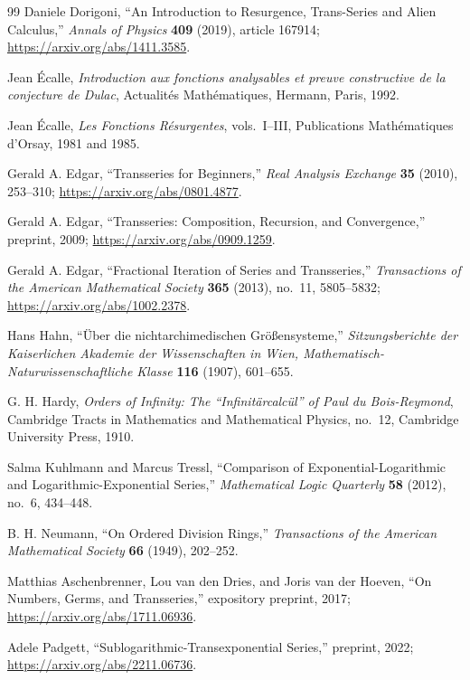 \documentclass[11pt,oneside]{book}
\theoremstyle{definition}
\theoremstyle{remark}
\begin{document}
{\begin{thebibliography}{99}
Daniele Dorigoni,
``An Introduction to Resurgence, Trans-Series and Alien Calculus,''
\emph{Annals of Physics} \textbf{409} (2019), article 167914;
\url{https://arxiv.org/abs/1411.3585}.

Jean \'Ecalle,
\emph{Introduction aux fonctions analysables et preuve constructive de la
conjecture de Dulac}, Actualit\'es Math\'ematiques, Hermann, Paris, 1992.

Jean \'Ecalle,
\emph{Les Fonctions R\'esurgentes}, vols.~I--III,
Publications Math\'ematiques d'Orsay, 1981 and 1985.

Gerald A. Edgar,
``Transseries for Beginners,''
\emph{Real Analysis Exchange} \textbf{35} (2010), 253--310;
\url{https://arxiv.org/abs/0801.4877}.

Gerald A. Edgar,
``Transseries: Composition, Recursion, and Convergence,'' preprint, 2009;
\url{https://arxiv.org/abs/0909.1259}.

Gerald A. Edgar,
``Fractional Iteration of Series and Transseries,''
\emph{Transactions of the American Mathematical Society}
\textbf{365} (2013), no.~11, 5805--5832;
\url{https://arxiv.org/abs/1002.2378}.

Hans Hahn,
``\"Uber die nichtarchimedischen Gr\"o\ss ensysteme,''
\emph{Sitzungsberichte der Kaiserlichen Akademie der Wissenschaften in Wien,
Mathematisch-Naturwissenschaftliche Klasse} \textbf{116} (1907), 601--655.

G. H. Hardy,
\emph{Orders of Infinity: The ``Infinit\"arcalc\"ul'' of Paul du Bois-Reymond},
Cambridge Tracts in Mathematics and Mathematical Physics, no.~12,
Cambridge University Press, 1910.

Salma Kuhlmann and Marcus Tressl,
``Comparison of Exponential-Logarithmic and Logarithmic-Exponential Series,''
\emph{Mathematical Logic Quarterly} \textbf{58} (2012), no.~6, 434--448.

B. H. Neumann,
``On Ordered Division Rings,''
\emph{Transactions of the American Mathematical Society}
\textbf{66} (1949), 202--252.

Matthias Aschenbrenner, Lou van den Dries, and Joris van der Hoeven,
``On Numbers, Germs, and Transseries,'' expository preprint, 2017;
\url{https://arxiv.org/abs/1711.06936}.

Adele Padgett,
``Sublogarithmic-Transexponential Series,'' preprint, 2022;
\url{https://arxiv.org/abs/2211.06736}.


\end{thebibliography}}
\end{document}
